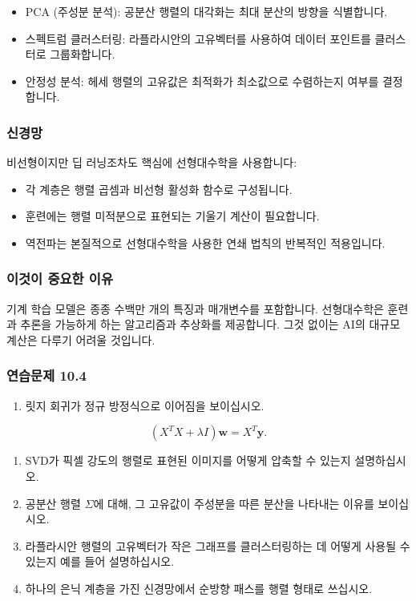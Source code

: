 \documentclass[
  12pt,
  a4paper,
]{article}
\begin{document}
\begin{itemize}
\item
  PCA (주성분 분석): 공분산 행렬의 대각화는 최대 분산의 방향을 식별합니다.
\item
  스펙트럼 클러스터링: 라플라시안의 고유벡터를 사용하여 데이터 포인트를 클러스터로 그룹화합니다.
\item
  안정성 분석: 헤세 행렬의 고유값은 최적화가 최소값으로 수렴하는지 여부를 결정합니다.
\end{itemize}

\subsubsection{신경망}\label{neural-networks}

비선형이지만 딥 러닝조차도 핵심에 선형대수학을 사용합니다:

\begin{itemize}
\item
  각 계층은 행렬 곱셈과 비선형 활성화 함수로 구성됩니다.
\item
  훈련에는 행렬 미적분으로 표현되는 기울기 계산이 필요합니다.
\item
  역전파는 본질적으로 선형대수학을 사용한 연쇄 법칙의 반복적인 적용입니다.
\end{itemize}

\subsubsection{이것이 중요한 이유}\label{why-this-matters-39}

기계 학습 모델은 종종 수백만 개의 특징과 매개변수를 포함합니다. 선형대수학은 훈련과 추론을 가능하게 하는 알고리즘과 추상화를 제공합니다. 그것 없이는 AI의 대규모 계산은 다루기 어려울 것입니다.

\subsubsection{연습문제 10.4}\label{exercises-104}

\begin{enumerate}
\def\labelenumi{\arabic{enumi}.}
\item
  릿지 회귀가 정규 방정식으로 이어짐을 보이십시오.
\end{enumerate}

\[(X^T X + \lambda I)\mathbf{w} = X^T \mathbf{y}.\]

\begin{enumerate}
\def\labelenumi{\arabic{enumi}.}
\item
  SVD가 픽셀 강도의 행렬로 표현된 이미지를 어떻게 압축할 수 있는지 설명하십시오.
\item
  공분산 행렬 \(\Sigma\)에 대해, 그 고유값이 주성분을 따른 분산을 나타내는 이유를 보이십시오.
\item
  라플라시안 행렬의 고유벡터가 작은 그래프를 클러스터링하는 데 어떻게 사용될 수 있는지 예를 들어 설명하십시오.
\item
  하나의 은닉 계층을 가진 신경망에서 순방향 패스를 행렬 형태로 쓰십시오.
\end{enumerate}
\end{document}
